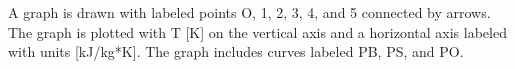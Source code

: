 A graph is drawn with labeled points O, 1, 2, 3, 4, and 5 connected by arrows. The graph is plotted with T [K] on the vertical axis and a horizontal axis labeled with units [kJ/kg*K]. The graph includes curves labeled PB, PS, and PO.